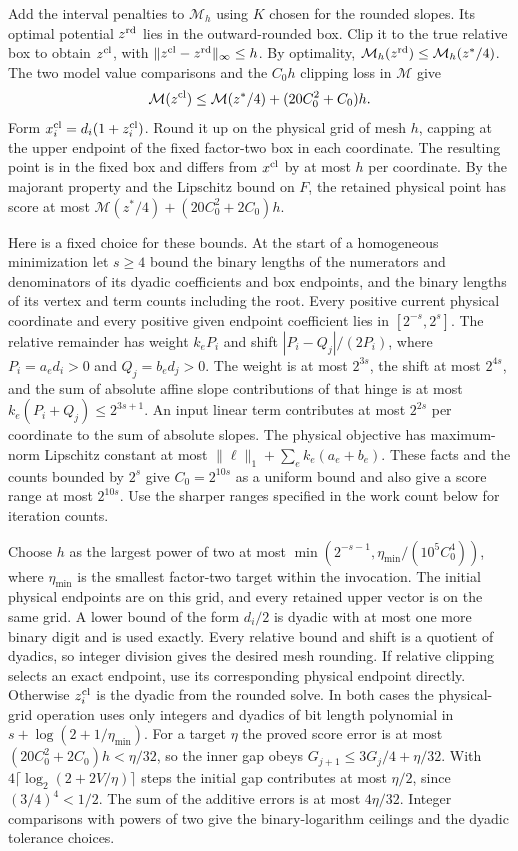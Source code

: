 \documentclass[11pt]{article}
\begin{document}
Add the interval penalties to \(\mathcal M_h\) using \(K\) chosen for the rounded slopes. Its optimal potential \(z^{\rm rd}\) lies in the outward-rounded box. Clip it to the true relative box to obtain \(z^{\rm cl}\), with \(\|z^{\rm cl}-z^{\rm rd}\|_\infty\le h\). By optimality, \(\mathcal M_h(z^{\rm rd})\le\mathcal M_h(z^*/4)\). The two model value comparisons and the \(C_0h\) clipping loss in \(\mathcal M\) give
\[
\mathcal M(z^{\rm cl})\le \mathcal M(z^*/4)+(20C_0^2+C_0)h.
\]
Form \(x^{\rm cl}_i=d_i(1+z_i^{\rm cl})\). Round it up on the physical grid of mesh \(h\), capping at the upper endpoint of the fixed factor-two box in each coordinate. The resulting point is in the fixed box and differs from \(x^{\rm cl}\) by at most \(h\) per coordinate. By the majorant property and the Lipschitz bound on \(F\), the retained physical point has score at most \(\mathcal M(z^*/4)+(20C_0^2+2C_0)h\).

Here is a fixed choice for these bounds. At the start of a homogeneous minimization let \(s\ge4\) bound the binary lengths of the numerators and denominators of its dyadic coefficients and box endpoints, and the binary lengths of its vertex and term counts including the root. Every positive current physical coordinate and every positive given endpoint coefficient lies in \([2^{-s},2^s]\). The relative remainder has weight \(k_e P_i\) and shift \(|P_i-Q_j|/(2P_i)\), where \(P_i=a_e d_i>0\) and \(Q_j=b_e d_j>0\). The weight is at most \(2^{3s}\), the shift at most \(2^{4s}\), and the sum of absolute affine slope contributions of that hinge is at most \(k_e(P_i+Q_j)\le 2^{3s+1}\). An input linear term contributes at most \(2^{2s}\) per coordinate to the sum of absolute slopes. The physical objective has maximum-norm Lipschitz constant at most \(\|\ell\|_1+\sum_e k_e(a_e+b_e)\). These facts and the counts bounded by \(2^s\) give \(C_0=2^{10s}\) as a uniform bound and also give a score range at most \(2^{10s}\). Use the sharper ranges specified in the work count below for iteration counts.

Choose \(h\) as the largest power of two at most \(\min(2^{-s-1},\eta_{\min}/(10^5 C_0^4))\), where \(\eta_{\min}\) is the smallest factor-two target within the invocation. The initial physical endpoints are on this grid, and every retained upper vector is on the same grid. A lower bound of the form \(d_i/2\) is dyadic with at most one more binary digit and is used exactly. Every relative bound and shift is a quotient of dyadics, so integer division gives the desired mesh rounding. If relative clipping selects an exact endpoint, use its corresponding physical endpoint directly. Otherwise \(z_i^{\rm cl}\) is the dyadic from the rounded solve. In both cases the physical-grid operation uses only integers and dyadics of bit length polynomial in \(s+\log(2+1/\eta_{\min})\). For a target \(\eta\) the proved score error is at most \((20C_0^2+2C_0)h<\eta/32\), so the inner gap obeys \(G_{j+1}\le 3G_j/4+\eta/32\). With \(4\lceil\log_2(2+2V/\eta)\rceil\) steps the initial gap contributes at most \(\eta/2\), since \((3/4)^4<1/2\). The sum of the additive errors is at most \(4\eta/32\). Integer comparisons with powers of two give the binary-logarithm ceilings and the dyadic tolerance choices.
\end{document}
